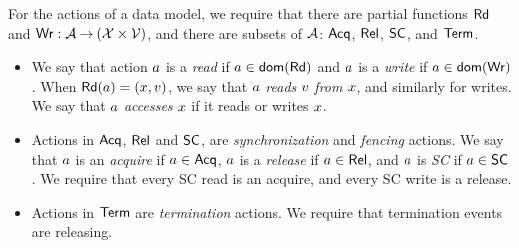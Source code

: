 For the actions of a data model, we require that
there are partial functions $\mathsf{Rd}$ and
$\mathsf{Wr}: \mathcal{A} \mathbin\rightarrow (\mathcal{X} \times \mathcal{V})$, and there are subsets of $\mathcal{A}$:
$\mathsf{Acq}$, $\mathsf{Rel}$, $\mathsf{SC}$, and $\mathsf{Term}$.

%
%
  \begin{itemize}    
  \item We say that action $a$ is a \emph{read} if
    $a\in\mathsf{dom}(\mathsf{Rd})$ and $a$ is a \emph{write} if
    $a\in\mathsf{dom}(\mathsf{Wr})$.  When $\mathsf{Rd}(a) = (x,v)$,
    we say that $a$ \emph{reads} $v$ \emph{from} $x$, and
    similarly for writes.  We say that $a$ \emph{accesses} $x$ if it
    reads or writes $x$.

  \item Actions in $\mathsf{Acq}$, $\mathsf{Rel}$ and $\mathsf{SC}$, are \emph{synchronization} and
    \emph{fencing} actions.  We say that $a$ is an \emph{acquire} if
    $a\in\mathsf{Acq}$, $a$ is a \emph{release} if $a\in\mathsf{Rel}$, and
    $a$ is \emph{SC} if $a\in\mathsf{SC}$.  We require that every SC read is
    an acquire, and every SC write is a release.

    
  \item Actions in $\mathsf{Term}$ are \emph{termination} actions. We require that
    termination events are releasing.
  \end{itemize}


